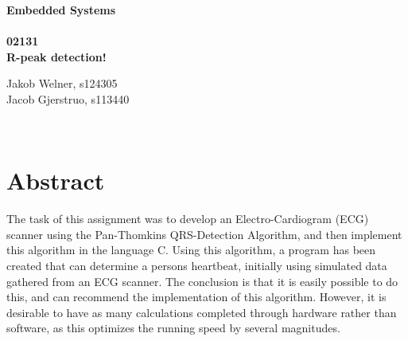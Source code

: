 \documentclass[12pt,a4paper]{article}
\begin{document}
\begin{titlepage}
	\begin{center}
		\vspace*{13\baselineskip}
		\huge
		\bfseries
		Embedded Systems\\ 
		\ \\
		02131 \\[5\baselineskip]

		\normalfont
		\Large
		R-peak detection!\\	

		\small
		\vfill
	\end{center}	
	\begin{flushleft}
		Jakob Welner, s124305\\
	 	Jacob Gjerstruo, s113440\\
	\end{flushleft}
\end{titlepage}

\ \\
\section*{Abstract}
The task of this assignment was to develop an Electro-Cardiogram (ECG) scanner using the Pan-Thomkins QRS-Detection Algorithm, and then implement this algorithm in the language C. Using this algorithm, a program has been created that can determine a persons heartbeat, initially using simulated data gathered from an ECG scanner. The conclusion is that it is easily possible to do this, and can recommend the implementation of this algorithm. However, it is desirable to have as many calculations completed through hardware rather than software, as this optimizes the running speed by several magnitudes.

\thispagestyle{empty} 
\newpage

\tableofcontents
\thispagestyle{empty} 
\newpage

\setcounter{page}{1}

\ \\
\end{document}
